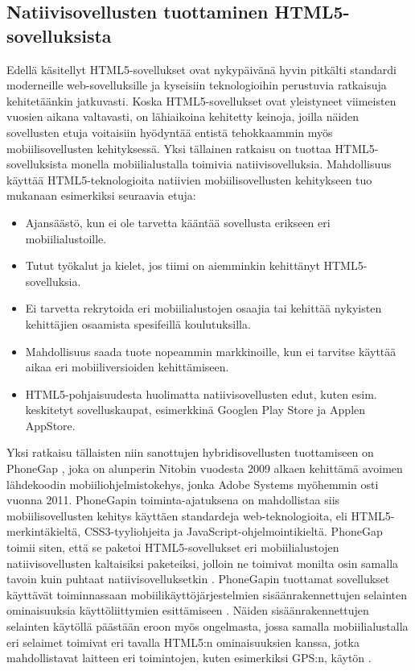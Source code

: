 \documentclass[finnish,nonumbib,nocopyright]{gradu2}
\begin{document}
\subsection{Natiivisovellusten tuottaminen HTML5-sovelluksista}
Edellä käsitellyt HTML5-sovellukset ovat nykypäivänä hyvin pitkälti standardi moderneille web-sovelluksille ja kyseisiin teknologioihin perustuvia ratkaisuja kehitetäänkin jatkuvasti. Koska HTML5-sovellukset ovat yleistyneet viimeisten vuosien aikana valtavasti, on lähiaikoina kehitetty keinoja, joilla näiden sovellusten etuja voitaisiin hyödyntää entistä tehokkaammin myös mobiilisovellusten kehityksessä. Yksi tällainen ratkaisu on tuottaa HTML5-sovelluksista monella mobiilialustalla toimivia natiivisovelluksia. Mahdollisuus käyttää HTML5-teknologioita natiivien mobiilisovellusten kehitykseen tuo mukanaan esimerkiksi seuraavia etuja:
\begin{itemize}
\item Ajansäästö, kun ei ole tarvetta kääntää sovellusta erikseen eri mobiilialustoille.
\item Tutut työkalut ja kielet, jos tiimi on aiemminkin kehittänyt HTML5-sovelluksia.
\item Ei tarvetta rekrytoida eri mobiilialustojen osaajia tai kehittää nykyisten kehittäjien osaamista spesifeillä koulutuksilla.
\item Mahdollisuus saada tuote nopeammin markkinoille, kun ei tarvitse käyttää aikaa eri mobiiliversioiden kehittämiseen.
\item HTML5-pohjaisuudesta huolimatta natiivisovellusten edut, kuten esim. keskitetyt sovelluskaupat, esimerkkinä Googlen Play Store ja Applen AppStore.
\end{itemize} 

Yksi ratkaisu tällaisten niin sanottujen hybridisovellusten tuottamiseen on PhoneGap \cite{phonegap}, joka on alunperin Nitobin vuodesta 2009 alkaen kehittämä avoimen lähdekoodin mobiiliohjelmistokehys, jonka Adobe Systems myöhemmin osti vuonna 2011. PhoneGapin toiminta-ajatuksena on mahdollistaa siis mobiilisovellusten kehitys käyttäen standardeja web-teknologioita, eli HTML5-merkintäkieltä, CSS3-tyyliohjeita ja JavaScript-ohjelmointikieltä. PhoneGap toimii siten, että se paketoi HTML5-sovellukset eri mobiilialustojen natiivisovellusten kaltaisiksi paketeiksi, jolloin ne toimivat monilta osin samalla tavoin kuin puhtaat natiivisovelluksetkin \cite{phonegap}. PhoneGapin tuottamat sovellukset käyttävät toiminnassaan mobiilikäyttöjärjestelmien sisäänrakennettujen selainten ominaisuuksia käyttöliittymien esittämiseen \cite{phonegap2}. Näiden sisäänrakennettujen selainten käytöllä päästään eroon myös ongelmasta, jossa samalla mobiilialustalla eri selaimet toimivat eri tavalla HTML5:n ominaisuuksien kanssa, jotka mahdollistavat laitteen eri toimintojen, kuten esimerkiksi GPS:n, käytön \cite{phonegap2}.
\end{document}
